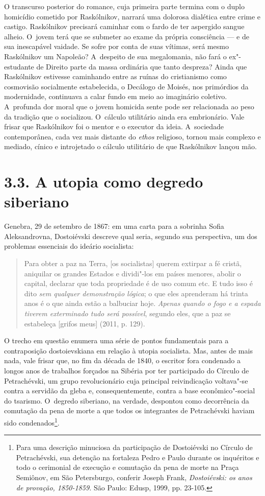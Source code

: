 O transcurso posterior do romance, cuja primeira parte termina com o
duplo homicídio cometido por Raskólnikov, narrará uma dolorosa dialética
entre crime e castigo. Raskólnikov precisará caminhar com o fardo de ter
aspergido sangue alheio. O~jovem terá que se submeter ao exame da
própria consciência --- e de sua inescapável vaidade. Se sofre por conta
de suas vítimas, será mesmo Raskólnikov um Napoleão? A~despeito de sua
megalomania, não fará o ex"-estudante de Direito parte da massa ordinária
que tanto despreza? Ainda que Raskólnikov estivesse caminhando entre as
ruínas do cristianismo como cosmovisão socialmente estabelecida, o
Decálogo de Moisés, nos primórdios da modernidade, continuava a calar
fundo em meio ao imaginário coletivo. A~profunda dor moral que o jovem
homicida sente pode ser relacionada ao peso da tradição que o
socializou. O~cálculo utilitário ainda era embrionário. Vale frisar que
Raskólnikov foi o mentor e o executor da ideia. A~sociedade
contemporânea, cada vez mais distante do \emph{ethos} religioso, tornou
mais complexo e mediado, cínico e introjetado o cálculo utilitário de
que Raskólnikov lançou mão.

\section{3.3. A utopia como degredo siberiano}

Genebra, 29 de setembro de 1867: em uma carta para a sobrinha Sofia
Aleksandrovna, Dostoiévski descreve qual seria, segundo sua perspectiva,
um dos problemas essenciais do ideário socialista:

\begin{quote}
Para obter a paz na Terra, {[}os socialistas{]} querem extirpar a fé
cristã, aniquilar os grandes Estados e dividi"-los em países menores,
abolir o capital, declarar que toda propriedade é de uso comum etc. E
tudo isso é dito \emph{sem qualquer demonstração lógica}; o que eles
aprenderam há trinta anos é o que ainda estão a balbuciar hoje.
\emph{Apenas quando o fogo e a espada tiverem exterminado tudo será
possível}, segundo eles, que a paz se estabeleça {[}grifos meus{]}
(2011, p. 129).
\end{quote}

O trecho em questão enumera uma série de pontos fundamentais para a
contraposição dostoievskiana em relação à utopia socialista. Mas, antes
de mais nada, vale frisar que, no fim da década de 1840, o escritor fora
condenado a longos anos de trabalhos forçados na Sibéria por ter
participado do Círculo de Petrachévski, um grupo revolucionário cuja
principal reivindicação voltava"-se contra a servidão da gleba e,
consequentemente, contra a base econômico"-social do tsarismo. O~degredo
siberiano, na verdade, despontou como decorrência da comutação da pena
de morte a que todos os integrantes de Petrachévski haviam sido
condenados\footnote{Para uma descrição minuciosa da participação de
  Dostoiévski no Círculo de Petrachévski, sua detenção na fortaleza
  Pedro e Paulo durante os inquéritos e todo o cerimonial de execução e
  comutação da pena de morte na Praça Semiônov, em São Petersburgo,
  conferir Joseph Frank, \emph{Dostoiévski: os anos de provação,
  1850-1859.} São Paulo: Edusp, 1999, pp. 23-105.}.

